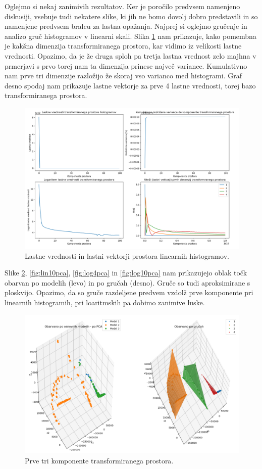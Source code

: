 \documentclass[a4paper]{IEEEtran}
\begin{document}
Oglejmo si nekaj zanimivih rezultatov. Ker je poročilo predvsem namenjeno diskusiji, vsebuje tudi nekatere slike, ki jih ne bomo dovolj dobro predstavili in so namenjene predvsem bralcu za lastna opažanja. Najprej si oglejmo gručenje in analizo gruč histogramov v linearni skali. Slika \ref{fig:lineig} nam prikazuje, kako pomembna je kakšna dimenzija transformiranega prostora, kar vidimo iz velikosti lastne vrednosti. Opazimo, da je že druga sploh pa tretja lastna vrednost zelo majhna v prmerjavi s prvo torej nam ta dimenzija prinese največ variance. Kumulativno nam prve tri dimenzije razložijo že skoraj vso varianco med histogrami. Graf desno spodaj nam prikazuje lastne vektorje za prve 4 lastne vrednosti, torej bazo transformiranega prostora.

\begin{figure}
	\centering
	\includegraphics[width=0.9\linewidth]{Figures/lin_eigendecomp}
	\caption{Lastne vrednosti in lastni vektorji prostora linearnih histogramov.}
	\label{fig:lineig}
\end{figure}

Slike  \ref{fig:lin4pca}, \ref{fig:lin10pca}, \ref{fig:log4pca} in \ref{fig:log10pca} nam prikazujejo oblak točk obarvan po modelih (levo) in po gručah (desno). Gruče so tudi aproksimirane s ploskvijo. Opazimo, da so gruče razdeljene predvem vzdolž prve komponente pri linearnih histogramih, pri loaritmskih pa dobimo zanimive luske.

\begin{figure}
	\centering
	\includegraphics[width=0.9\linewidth]{Figures/lin4pca}
	\caption{Prve tri komponente transformiranega prostora.}
	\label{fig:lin4pca}
\end{figure}
\end{document}
